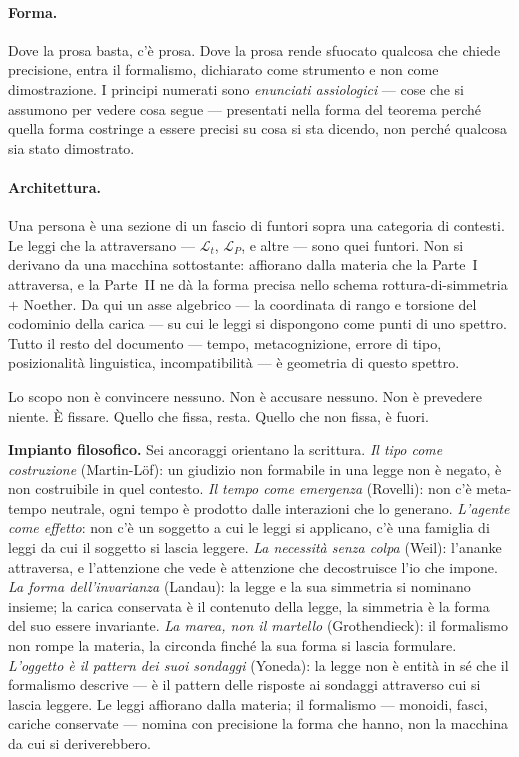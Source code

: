 \documentclass[
    oneside,                 %
    openany,                 %
    titlepage,
    11pt,
    a4paper,
    italian,
    DIV=14,                  %
    headinclude,
    footinclude=true,
    cleardoublepage=empty
]{scrbook}
\theoremstyle{ctplain}
\theoremstyle{ctdef}
\theoremstyle{ctrem}
\newcommand{\Lt}{\mathcal{L}_t}
\newcommand{\LP}{\mathcal{L}_P}
\begin{document}
\paragraph{Forma.} Dove la prosa basta, c'è prosa. Dove la prosa rende sfuocato qualcosa che chiede precisione, entra il formalismo, dichiarato come strumento e non come dimostrazione. I principi numerati sono \emph{enunciati assiologici} --- cose che si assumono per vedere cosa segue --- presentati nella forma del teorema perché quella forma costringe a essere precisi su cosa si sta dicendo, non perché qualcosa sia stato dimostrato.

\paragraph{Architettura.} Una persona è una sezione di un fascio di funtori sopra una categoria di contesti. Le leggi che la attraversano --- $\Lt$, $\LP$, e altre --- sono quei funtori. Non si derivano da una macchina sottostante: affiorano dalla materia che la Parte~I attraversa, e la Parte~II ne dà la forma precisa nello schema rottura-di-simmetria $+$ Noether. Da qui un asse algebrico --- la coordinata di rango e torsione del codominio della carica --- su cui le leggi si dispongono come punti di uno spettro. Tutto il resto del documento --- tempo, metacognizione, errore di tipo, posizionalità linguistica, incompatibilità --- è geometria di questo spettro.

Lo scopo non è convincere nessuno. Non è accusare nessuno. Non è prevedere niente. È fissare. Quello che fissa, resta. Quello che non fissa, è fuori.

\bigskip

\noindent\textbf{Impianto filosofico.} Sei ancoraggi orientano la scrittura. \emph{Il tipo come costruzione} (Martin-L\"of): un giudizio non formabile in una legge non è negato, è non costruibile in quel contesto. \emph{Il tempo come emergenza} (Rovelli): non c'è meta-tempo neutrale, ogni tempo è prodotto dalle interazioni che lo generano. \emph{L'agente come effetto}: non c'è un soggetto a cui le leggi si applicano, c'è una famiglia di leggi da cui il soggetto si lascia leggere. \emph{La necessità senza colpa} (Weil): l'ananke attraversa, e l'attenzione che vede è attenzione che decostruisce l'io che impone. \emph{La forma dell'invarianza} (Landau): la legge e la sua simmetria si nominano insieme; la carica conservata è il contenuto della legge, la simmetria è la forma del suo essere invariante. \emph{La marea, non il martello} (Grothendieck): il formalismo non rompe la materia, la circonda finché la sua forma si lascia formulare. \emph{L'oggetto è il pattern dei suoi sondaggi} (Yoneda): la legge non è entità in sé che il formalismo descrive --- è il pattern delle risposte ai sondaggi attraverso cui si lascia leggere. Le leggi affiorano dalla materia; il formalismo --- monoidi, fasci, cariche conservate --- nomina con precisione la forma che hanno, non la macchina da cui si deriverebbero.
\end{document}
